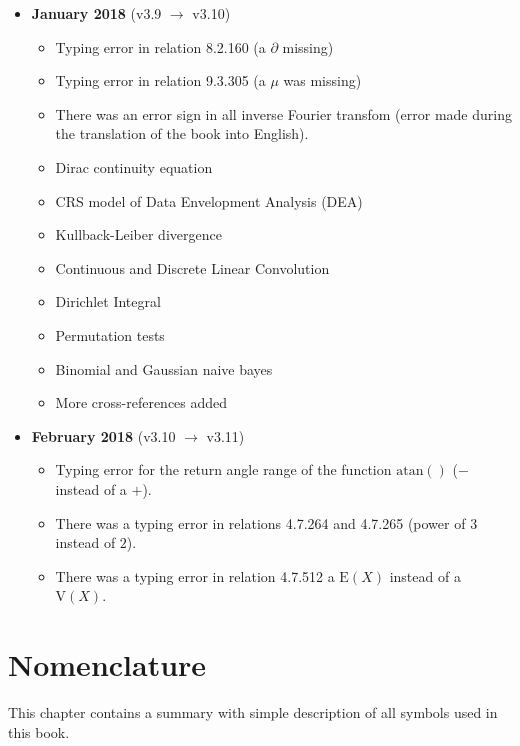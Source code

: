 \documentclass[12pt,a4paper,twoside,openright]{report}
\theoremstyle{definition}
\theoremstyle{itexmp}
\numberwithin{equation}{section}
\begin{document}
\begin{itemize}
\begin{itemize}[noitemsep]
			\end{itemize}
		\item \textbf{January 2018} (v3.9 $\rightarrow$ v3.10)
			\begin{itemize}[noitemsep]
				\item Typing error in relation 8.2.160 (a $\partial$ missing)
				\item Typing error in relation 9.3.305 (a $\mu$ was missing)
				\item There was an error sign in all inverse Fourier transfom (error made during the translation of the book into English).
				\item Dirac continuity equation
				\item CRS model of Data Envelopment Analysis (DEA)
				\item Kullback-Leiber divergence
				\item Continuous and Discrete Linear Convolution
				\item Dirichlet Integral
				\item Permutation tests
				\item Binomial and Gaussian naive bayes
				\item More cross-references added
			\end{itemize}
			\item \textbf{February 2018} (v3.10 $\rightarrow$ v3.11)
			\begin{itemize}[noitemsep]
				\item Typing error for the return angle range of the function $\mathrm{atan()}$ ($-$ instead of a $+$).
				\item There was a typing error in relations 4.7.264 and 4.7.265 (power of $3$ instead of $2$).
				\item There was a typing error in relation 4.7.512 a $\text{E}(X)$ instead of a $\text{V}(X)$.
			\end{itemize}
	\end{itemize}

\chapter{Nomenclature}

This chapter contains a summary with simple description of all symbols used in this book.
\end{document}
